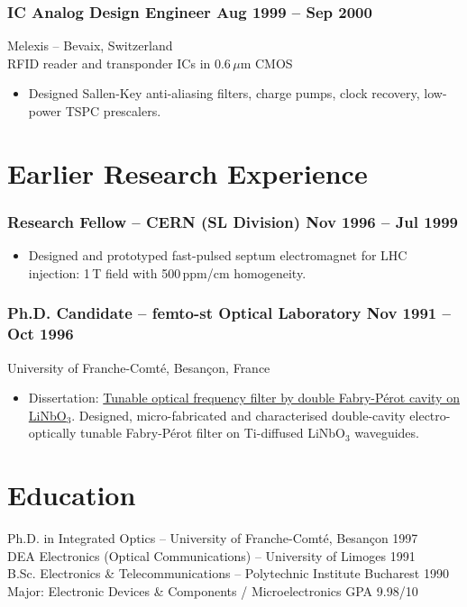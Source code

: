 \documentclass[11pt,a4paper]{article}
\begin{document}
	\subsubsection*{IC Analog Design Engineer \hfill Aug 1999 -- Sep 2000}
	Melexis -- Bevaix, Switzerland \\
	RFID reader and transponder ICs in 0.6\,$\mu$m CMOS
	\begin{itemize}
		\item Designed Sallen-Key anti-aliasing filters, charge pumps, clock recovery, low-power TSPC prescalers.
	\end{itemize}
	
	\section{Earlier Research Experience}
	\subsubsection*{Research Fellow -- CERN (SL Division) \hfill Nov 1996 -- Jul 1999}
	\begin{itemize}
		\item[] Designed and prototyped fast-pulsed septum electromagnet for LHC injection: 1\,T field with 500\,ppm/cm homogeneity.
	\end{itemize}
	
	\subsubsection*{Ph.D. Candidate -- femto-st Optical Laboratory \hfill Nov 1991 -- Oct 1996}
	University of Franche-Comté, Besançon, France
	\begin{itemize}
		\item[] Dissertation: \href{https://theses.fr/1997BESA2044}{Tunable optical frequency filter by double Fabry-Pérot cavity on LiNbO$_3$}. Designed, micro-fabricated and characterised double-cavity electro-optically tunable Fabry-Pérot filter on Ti-diffused LiNbO$_3$ waveguides.
	\end{itemize}
	
	\section{Education}
	Ph.D. in Integrated Optics -- University of Franche-Comté, Besançon \hfill 1997 \\
	DEA Electronics (Optical Communications) -- University of Limoges \hfill 1991 \\
	B.Sc. Electronics \& Telecommunications -- Polytechnic Institute Bucharest \hfill 1990 \\
	\quad Major: Electronic Devices \& Components / Microelectronics \quad GPA 9.98/10
	
\end{document}
